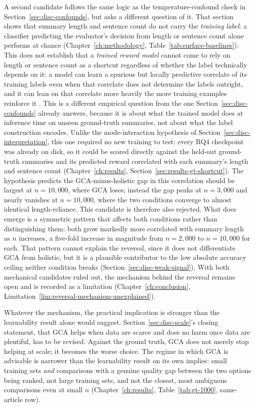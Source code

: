 A second candidate follows the same logic as the temperature-confound check
in Section~\ref{sec:disc-confounds}, but asks a different question of it.
That section shows that summary length and sentence count do not carry the
\emph{training label}: a classifier predicting the evaluator's decision from
length or sentence count alone performs at chance
(Chapter~\ref{ch:methodology}, Table~\ref{tab:surface-baselines}). This does
not establish that a \emph{trained reward model} cannot come to rely on
length or sentence count as a shortcut regardless of whether the label
technically depends on it: a model can learn a spurious but locally
predictive correlate of its training labels even when that correlate does not
determine the labels outright, and it can lean on that correlate more heavily
the more training examples reinforce it \citep{geirhos2020shortcut}. This is
a different empirical question from the one Section~\ref{sec:disc-confounds}
already answers, because it is about what the trained model does at
inference time on unseen ground-truth summaries, not about what the label
construction encodes. Unlike the mode-interaction hypothesis of
Section~\ref{sec:disc-interpretation}, this one required no new training to
test: every RQ4 checkpoint was already on disk, so it could be scored
directly against the held-out ground-truth summaries and its predicted
reward correlated with each summary's length and sentence count
(Chapter~\ref{ch:results}, Section~\ref{sec:results-gt-shortcut}). The
hypothesis predicts the GCA-minus-holistic gap in this correlation should be
largest at $n=10{,}000$, where GCA loses; instead the gap peaks at
$n=3{,}000$ and nearly vanishes at $n=10{,}000$, where the two conditions
converge to almost identical length-reliance. This candidate is therefore
also rejected. What does emerge is a symmetric pattern that affects both
conditions rather than distinguishing them: both grow markedly more
correlated with summary length as $n$ increases, a five-fold increase in
magnitude from $n=2{,}000$ to $n=10{,}000$ for each. That pattern cannot
explain the reversal, since it does not differentiate GCA from holistic, but
it is a plausible contributor to the low absolute accuracy ceiling neither
condition breaks (Section~\ref{sec:disc-weak-signal}). With both mechanical
candidates ruled out, the mechanism behind the reversal remains open and is
recorded as a limitation (Chapter~\ref{ch:conclusion},
Limitation~\ref{lim:reversal-mechanism-unexplained}).

Whatever the mechanism, the practical implication is stronger than the
learnability result alone would suggest. Section~\ref{sec:disc-scale}'s
closing statement, that GCA helps when data are scarce and does no harm
once data are plentiful, has to be revised. Against the ground truth, GCA
does not merely stop helping at scale; it becomes the worse choice. The
regime in which GCA is advisable is narrower than the learnability result on
its own implies: small training sets \emph{and} comparisons with a genuine
quality gap between the two options being ranked, not large training sets,
and not the closest, most ambiguous comparisons even at small $n$
(Chapter~\ref{ch:results}, Table~\ref{tab:gt-1000}, same-article row).

